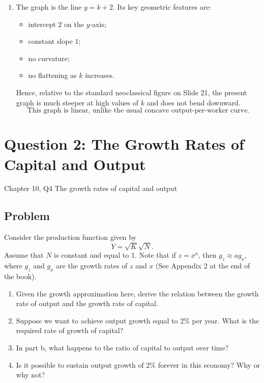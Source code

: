 \documentclass[12pt]{article}
\begin{document}
\begin{enumerate}[label=(\alph*)]
    \item
    The graph is the line \(y=k+2\). Its key geometric features are:
    \begin{itemize}[leftmargin=*]
        \item intercept \(2\) on the \(y\)-axis;
        \item constant slope \(1\);
        \item no curvature;
        \item no flattening as \(k\) increases.
    \end{itemize}
    Hence, relative to the standard neoclassical figure on Slide 21, the present graph is much steeper at high values of \(k\) and does not bend downward.
    \[
    \boxed{\text{This graph is linear, unlike the usual concave output-per-worker curve.}}
    \]
\end{enumerate}

\newpage
\section{Question 2: The Growth Rates of Capital and Output}

\noindent
Chapter 10, Q4 The growth rates of capital and output

\subsection{Problem}
Consider the production function given by
\[
Y=\sqrt{K}\sqrt{N}.
\]
Assume that \(N\) is constant and equal to 1. Note that if \(z=x^a\), then \(g_z\approx ag_x\), where \(g_z\) and \(g_x\) are the growth rates of \(z\) and \(x\) (See Appendix 2 at the end of the book).

\begin{enumerate}[label=(\alph*)]
    \item Given the growth approximation here, derive the relation between the growth rate of output and the growth rate of capital.
    \item Suppose we want to achieve output growth equal to 2\% per year. What is the required rate of growth of capital?
    \item In part b, what happens to the ratio of capital to output over time?
    \item Is it possible to sustain output growth of 2\% forever in this economy? Why or why not?
\end{enumerate}
\end{document}
